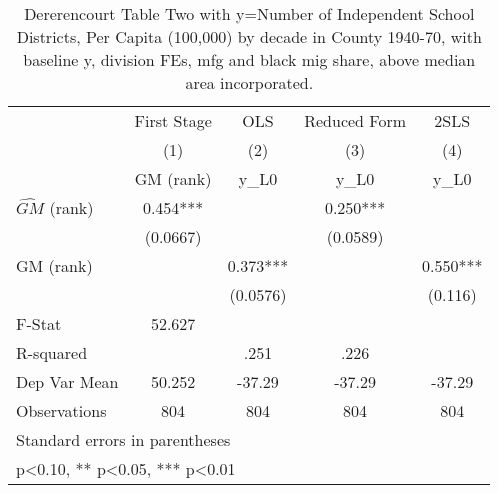 \begin{table}[htbp]\centering
\def\sym#1{\ifmmode^{#1}\else\(^{#1}\)\fi}
\caption{Dererencourt Table Two with y=Number of Independent School Districts, Per Capita (100,000) by decade in County 1940-70, with baseline y, division FEs, mfg and black mig share, above median area incorporated.}
\begin{tabular}{l*{4}{c}}
\toprule
                    & First Stage   &         OLS   &Reduced Form   &        2SLS   \\
                    &\multicolumn{1}{c}{(1)}&\multicolumn{1}{c}{(2)}&\multicolumn{1}{c}{(3)}&\multicolumn{1}{c}{(4)}\\
                    &\multicolumn{1}{c}{GM  (rank)}&\multicolumn{1}{c}{y\_L0}&\multicolumn{1}{c}{y\_L0}&\multicolumn{1}{c}{y\_L0}\\
\midrule
$\hat{GM}$ (rank)   &       0.454***&               &       0.250***&               \\
                    &    (0.0667)   &               &    (0.0589)   &               \\
\addlinespace
GM  (rank)          &               &       0.373***&               &       0.550***\\
                    &               &    (0.0576)   &               &     (0.116)   \\
\midrule
F-Stat              &      52.627   &               &               &               \\
R-squared           &               &        .251   &        .226   &               \\
Dep Var Mean        &      50.252   &      -37.29   &      -37.29   &      -37.29   \\
Observations        &         804   &         804   &         804   &         804   \\
\bottomrule
\multicolumn{5}{l}{\footnotesize Standard errors in parentheses}\\
\multicolumn{5}{l}{\footnotesize * p<0.10, ** p<0.05, *** p<0.01}\\
\end{tabular}
\end{table}
